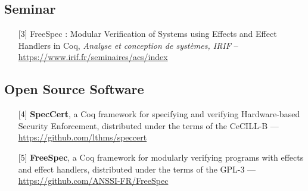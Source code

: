 \documentclass{article}
\begin{document}
\subsection{Seminar}

\begin{itemize}
\item[] [3] FreeSpec : Modular Verification of Systems using Effects and Effect
  Handlers in Coq, \emph{Analyse et conception de systèmes, IRIF} --
  \url{https://www.irif.fr/seminaires/acs/index}
\end{itemize}

\subsection{Open Source Software}

\begin{itemize}
\item[] [4] \textbf{SpecCert}, a Coq framework for specifying and verifying
  Hardware-based Security Enforcement, distributed under the terms of the
  CeCILL-B --- \url{https://github.com/lthms/speccert}
\item[] [5] \textbf{FreeSpec}, a Coq framework for modularly verifying programs
  with effects and effect handlers, distributed under the terms of the GPL-3 ---
  \url{https://github.com/ANSSI-FR/FreeSpec}
\end{itemize}
\end{document}
